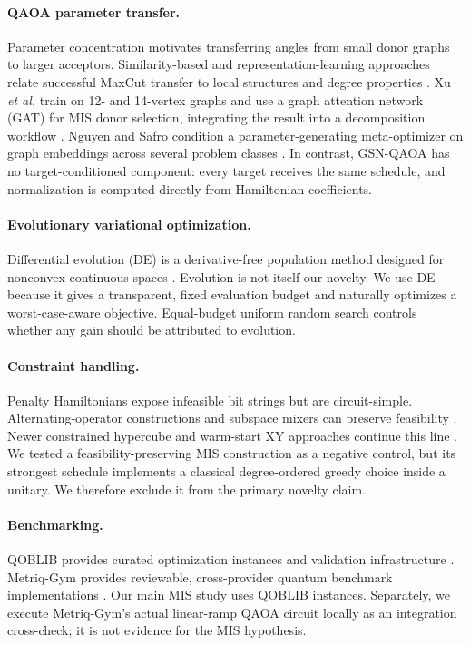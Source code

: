 \documentclass[10pt,twocolumn]{article}
\newcommand{\method}{GSN-QAOA}
\begin{document}
\paragraph{QAOA parameter transfer.}
Parameter concentration motivates transferring angles from small donor graphs to larger acceptors. Similarity-based and representation-learning approaches relate successful MaxCut transfer to local structures and degree properties \cite{galda2023similarity,falla2024graph}. Xu \emph{et al.} train on 12- and 14-vertex graphs and use a graph attention network (GAT) for MIS donor selection, integrating the result into a decomposition workflow \cite{xu2025gat}. Nguyen and Safro condition a parameter-generating meta-optimizer on graph embeddings across several problem classes \cite{nguyen2026meta}. In contrast, \method{} has no target-conditioned component: every target receives the same schedule, and normalization is computed directly from Hamiltonian coefficients.

\paragraph{Evolutionary variational optimization.}
Differential evolution (DE) is a derivative-free population method designed for nonconvex continuous spaces \cite{storn1997differential}. Evolution is not itself our novelty. We use DE because it gives a transparent, fixed evaluation budget and naturally optimizes a worst-case-aware objective. Equal-budget uniform random search controls whether any gain should be attributed to evolution.

\paragraph{Constraint handling.}
Penalty Hamiltonians expose infeasible bit strings but are circuit-simple. Alternating-operator constructions and subspace mixers can preserve feasibility \cite{hadfield2019alternating,fuchs2024lx}. Newer constrained hypercube and warm-start XY approaches continue this line \cite{wang2026hypercube,aqarios2026warmstart}. We tested a feasibility-preserving MIS construction as a negative control, but its strongest schedule implements a classical degree-ordered greedy choice inside a unitary. We therefore exclude it from the primary novelty claim.

\paragraph{Benchmarking.}
QOBLIB provides curated optimization instances and validation infrastructure \cite{koch2026qoblib}. Metriq-Gym provides reviewable, cross-provider quantum benchmark implementations \cite{metriqgym}. Our main MIS study uses QOBLIB instances. Separately, we execute Metriq-Gym's actual linear-ramp QAOA circuit locally as an integration cross-check; it is not evidence for the MIS hypothesis.
\end{document}
